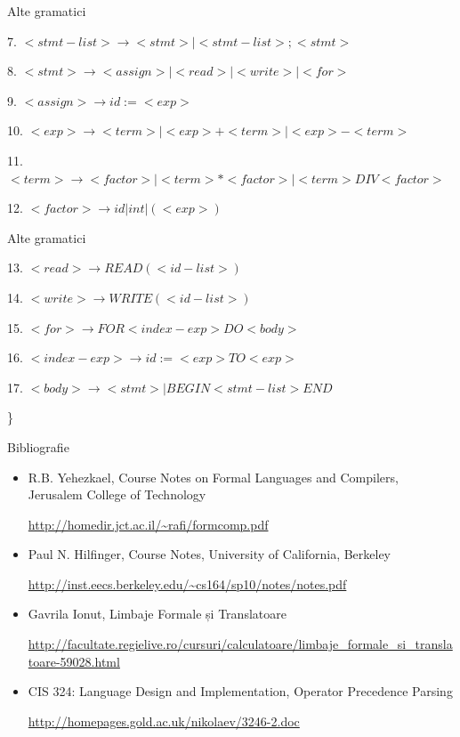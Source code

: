 \documentclass[pdf]{beamer}
\begin{document}
\begin{frame}{Alte gramatici}

7. $<stmt-list> \rightarrow <stmt> | <stmt-list> ; <stmt> $

8. $<stmt> \rightarrow <assign> | <read> | <write> | <for> $

9. $<assign> \rightarrow id := <exp> $

10. $<exp> \rightarrow <term> | <exp> + <term> | <exp> - <term> $

11. $<term> \rightarrow <factor> | <term> * <factor> | <term> DIV <factor> $

12. $<factor> \rightarrow id | int | ( <exp> ) $

\end{frame}



\begin{frame}{Alte gramatici}

13. $<read> \rightarrow READ ( <id-list> ) $

14. $<write> \rightarrow WRITE ( <id-list> ) $

15. $<for> \rightarrow FOR <index-exp> DO <body> $

16. $<index-exp> \rightarrow id := <exp> TO <exp> $

17. $<body> \rightarrow <stmt> | BEGIN <stmt-list> END $

\}
\end{frame}



\begin{frame}{Bibliografie}
\begin{itemize}
\item
R.B. Yehezkael, Course Notes on Formal Languages and Compilers, Jerusalem College of Technology

\url{http://homedir.jct.ac.il/~rafi/formcomp.pdf}

\item
Paul N. Hilfinger, Course Notes, University of California, Berkeley

\url{http://inst.eecs.berkeley.edu/~cs164/sp10/notes/notes.pdf}

\item
Gavrila Ionut, Limbaje Formale și Translatoare

\url{http://facultate.regielive.ro/cursuri/calculatoare/limbaje_formale_si_translatoare-59028.html}

\item
CIS 324: Language Design and Implementation, Operator Precedence Parsing

\url{http://homepages.gold.ac.uk/nikolaev/3246-2.doc}
\end{itemize}
\end{frame}
\end{document}
